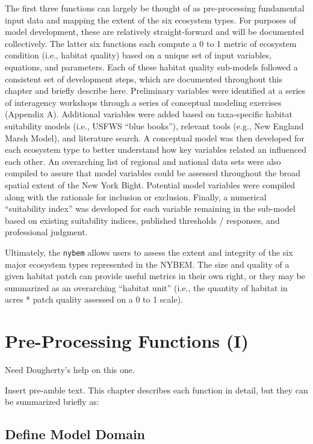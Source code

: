 \documentclass[
]{book}
\begin{document}
The first three functions can largely be thought of as pre-processing fundamental input data and mapping the extent of the six ecosystem types. For purposes of model development, these are relatively straight-forward and will be documented collectively. The latter six functions each compute a 0 to 1 metric of ecosystem condition (i.e., habitat quality) based on a unique set of input variables, equations, and parameters. Each of these habitat quality sub-models followed a consistent set of development steps, which are documented throughout this chapter and briefly describe here. Preliminary variables were identified at a series of interagency workshops through a series of conceptual modeling exercises (Appendix A). Additional variables were added based on taxa-specific habitat suitability models (i.e., USFWS ``blue books''), relevant tools (e.g., New England Marsh Model), and literature search. A conceptual model was then developed for each ecosystem type to better understand how key variables related an influenced each other. An overarching list of regional and national data sets were also compiled to assure that model variables could be assessed throughout the broad spatial extent of the New York Bight. Potential model variables were compiled along with the rationale for inclusion or exclusion. Finally, a numerical ``suitability index'' was developed for each variable remaining in the sub-model based on existing suitability indices, published thresholds / responses, and professional judgment.

Ultimately, the \texttt{nybem} allows users to assess the extent and integrity of the six major ecosystem types represented in the NYBEM. The size and quality of a given habitat patch can provide useful metrics in their own right, or they may be summarized as an overarching ``habitat unit'' (i.e., the quantity of habitat in acres * patch quality assessed on a 0 to 1 scale).

\hypertarget{pre-processing-functions-i}{%
\section{Pre-Processing Functions (I)}\label{pre-processing-functions-i}}

{Need Dougherty's help on this one.}

Insert pre-amble text. This chapter describes each function in detail, but they can be summarized briefly as:

\hypertarget{define-model-domain}{%
\subsection{Define Model Domain}\label{define-model-domain}}
\end{document}
